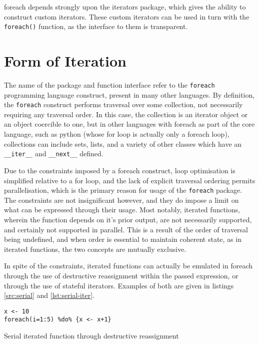 \documentclass[a4paper,10pt]{article}
\begin{document}
foreach depends strongly upon the iterators package, which gives the
ability to construct custom iterators. These custom iterators can be
used in turn with the \texttt{foreach()} function, as the interface to
them is transparent.

\section{Form of Iteration}\label{sec:form-iter}

The name of the package and function interface refer to the \texttt{foreach}
programming language construct, present in many other languages.
By definition, the \texttt{foreach} construct performs traversal over some
collection, not necessarily requiring any traversal order.
In this case, the collection is an iterator object or an object coercible to
one, but in other languages with foreach as part of the core language, such as
python (whose for loop is actually only a foreach loop), collections can
include sets, lists, and a variety of other classes which have an
\texttt{\_\_iter\_\_} and \texttt{\_\_next\_\_} defined\cite{python2020iter}.

Due to the constraints imposed by a foreach construct, loop optimisation is
simplified relative to a for loop, and the lack of explicit traversal ordering
permits parallelisation, which is the primary reason for usage of the
\texttt{foreach} package.
The constraints are not insignificant however, and they do impose a limit on
what can be expressed through their usage.
Most notably, iterated functions, wherein the function depends on it's prior
output, are not necessarily supported, and certainly not supported in parallel.
This is a result of the order of traversal being undefined, and when order is
essential to maintain coherent state, as in iterated functions, the two
concepts are mutually exclusive.

In spite of the constraints, iterated functions can actually be emulated in
foreach through the use of destructive reassignment within the passed
expression, or through the use of stateful iterators.
Examples of both are given in listings \ref{src:serial} and \ref{lst:serial-iter}.

\begin{listing}
\begin{verbatim}
x <- 10
foreach(i=1:5) %do% {x <- x+1}
\end{verbatim}
\caption{Serial iterated function through destructive reassignment}\label{src:serial}
\end{listing}
\end{document}
